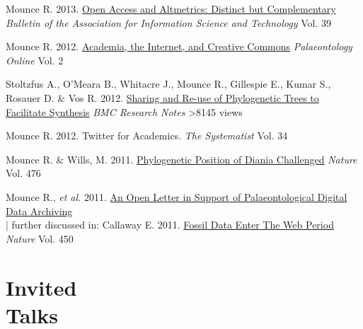 \documentclass[margin,line]{resume}
\begin{document}
\begin{resume}
\vspace{-2mm}
    Mounce R. 2013.  \href{http://dx.doi.org/10.1002/bult.2013.1720390406}{Open Access and Altmetrics: Distinct but Complementary} \\ \textsl{Bulletin of the Association for Information Science and Technology} Vol. 39

\vspace{-2mm}
    Mounce R. 2012.  \href{http://www.palaeontologyonline.com/articles/2012/life-as-a-palaeontologist-academia-the-internet-and-creative-commons/}{Academia, the Internet, and Creative Commons} \textsl{Palaeontology Online} Vol. 2

\vspace{-2mm}
    Stoltzfus A., O'Meara B., Whitacre J., Mounce R., Gillespie E., Kumar S., Rosauer D. \& Vos R. 2012. \href{http://dx.doi.org/10.1186/1756-0500-5-574}{Sharing and Re-use of Phylogenetic Trees to Facilitate Synthesis} \textsl{BMC Research Notes} \hfill {\color{red} \textgreater8145 views}

\vspace{-2mm}
    Mounce R. 2012. Twitter for Academics.
    \textsl{The Systematist} Vol. 34

\vspace{-2mm}
    Mounce R. \& Wills, M. 2011. \href{http://dx.doi.org/10.1038/nature10266}{Phylogenetic Position of Diania Challenged}
    \textsl{Nature} Vol. 476

\vspace{-2mm}
    Mounce R., \textsl{et al.} 2011.
    \href{http://www.supportpalaeodataarchiving.co.uk/}{An Open Letter in Support of Palaeontological Digital Data Archiving} \\

\vspace{-6.5 mm} 
\vspace{-2mm} | further discussed in: Callaway E. 2011. \href{http://www.nature.com/news/2011/110411/full/472150a.html}{Fossil Data Enter The Web Period} \textsl{Nature} Vol. 450\\

\vspace{-7 mm}

    \section{\mysidestyle Invited\\Talks}


\end{resume}
\end{document}
